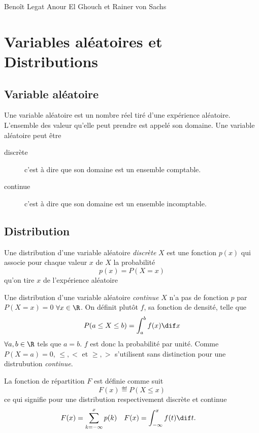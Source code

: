 

\def\Perp{\perp\!\!\!\perp}

\renewcommand{\E}{\mathbb{E}}
\newcommand{\N}{\mathcal{N}}
\DeclareMathOperator{\var}{\mathbb{V}ar}
\DeclareMathOperator{\cov}{Cov}
\DeclareMathOperator{\bias}{Bias}

\DeclareMathOperator{\expo}{Expo}
\DeclareMathOperator{\gammad}{Gamma}
\DeclareMathOperator{\po}{Po}

{Benoît Legat}
{Anour El Ghouch et Rainer von Sachs}

\section{Variables aléatoires et Distributions}
\subsection{Variable aléatoire}
Une variable aléatoire est un nombre réel tiré d'une expérience aléatoire.
L'ensemble des valeur qu'elle peut prendre est appelé son domaine.
Une variable aléatoire peut être
\begin{description}
  \item[discrète]
    c'est à dire que son domaine est un ensemble comptable.
  \item[continue]
    c'est à dire que son domaine est un ensemble incomptable.
\end{description}

\subsection{Distribution}
Une distribution d'une variable aléatoire \emph{discrète} $X$ est une fonction $p(x)$ qui associe pour
chaque valeur $x$ de $X$ la probabilité
\[ p(x) = P(X = x) \]
qu'on tire $x$ de l'expérience aléatoire

Une distribution d'une variable aléatoire \emph{continue} $X$ n'a pas de fonction $p$ par $P(X = x) = 0$
$\forall x \in \R$.
On définit plutôt $f$, sa fonction de densité, telle que
\[ P(a \leq X \leq b) = \int_a^b f(x) \dif x \]
$\forall a, b \in \R$ tels que $a = b$.
$f$ est donc la probabilité par unité.
Comme $P(X = a) = 0$, $\leq, <$ et $\geq, >$ s'utilisent sans distinction pour une distrubution \emph{continue}.

La fonction de répartition $F$ est définie comme suit
\[ F(x) \eqdef P(X \leq x) \]
ce qui signifie pour une distribution respectivement discrète et continue
\begin{align*}
  F(x) & = \sum_{k = -\infty}^x p(k) & F(x) & = \int_{-\infty}^x f(t) \dif t.
\end{align*}

